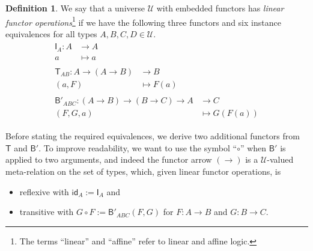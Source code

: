 \documentclass[a4paper]{article}
\theoremstyle{definition}
\newtheorem{definition}{Definition}[section]
\theoremstyle{remark}
\newcommand{\defn}{\emph}
\newcommand{\U}{\mathcal{U}}
\newcommand{\nm}{\mathsf}
\newcommand{\id}{\nm{id}}
\newcommand{\combinator}{\nm}
\newcommand{\idFun}{\combinator{I}}
\newcommand{\appFun}{\combinator{T}}
\newcommand{\compFun}{\combinator{B'}}
\begin{document}
\begin{definition}
  We say that a universe $\U$ with embedded functors has \defn{linear functor
  operations}\footnote{The terms ``linear'' and ``affine'' refer to linear and affine logic.}
  if we have the following three functors and six instance equivalences for all types
  $A,B,C,D \in \U.$
  \vspace{1ex}
  \begin{gather*}
    \begin{aligned}
      \idFun_A : A &\to     A\\
                 a &\mapsto a
    \end{aligned}\\[1em]
    \begin{aligned}
      \appFun_{AB} : A \to (A \to B) &\to     B\\
                     (a,F)           &\mapsto F(a)
    \end{aligned}\\[1em]
    \begin{aligned}
      \compFun_{ABC} : (A \to B) \to (B \to C) \to A &\to     C\\
                       (F,G,a)                       &\mapsto G(F(a))
    \end{aligned}
  \end{gather*}

  Before stating the required equivalences, we derive two additional functors from $\appFun$
  and $\compFun.$
  To improve readability, we want to use the symbol ``$\circ$'' when $\compFun$ is applied to
  two arguments, and indeed the functor arrow $(\to)$ is a $\U$-valued meta-relation on the
  set of types, which, given linear functor operations, is
  \begin{itemize}
    \item reflexive with $\id_A := \idFun_A$ and
    \item transitive with $G \circ F := \compFun_{ABC}(F,G)$ for $F : A \to B$ and
    $G : B \to C.$
  \end{itemize}


\end{definition}
\end{document}
